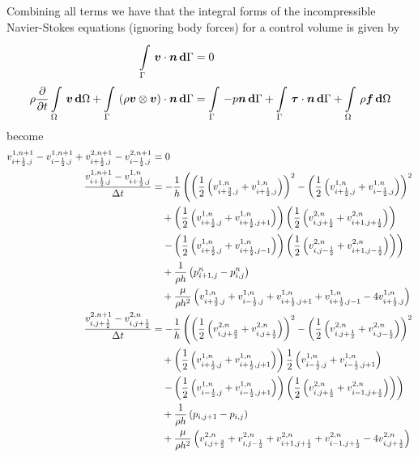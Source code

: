 Combining all terms we have that the integral forms of the incompressible Navier-Stokes
equations (ignoring body forces) for a control volume is given by
\begin{equation}
  \begin{split}
      \displaystyle\int\limits_{\Gamma}^{} \,\boldsymbol{v}\cdot\boldsymbol{n}\, \boldsymbol{\mathrm{d}} \Gamma &=0 \\
    \rho \dfrac{\partial }{\partial t}   \displaystyle\int\limits_{\Omega}^{} \,\boldsymbol{v}\, \boldsymbol{\mathrm{d}} \Omega +  \displaystyle\int\limits_{\Gamma}^{} \,\left(  \rho\boldsymbol{v} \otimes \boldsymbol{v}  \right)\cdot\boldsymbol{n}\, \boldsymbol{\mathrm{d}} \Gamma 
  &=  \displaystyle\int\limits_{\Gamma}^{} \,-p\boldsymbol{n}\, \boldsymbol{\mathrm{d}} \Gamma +  \displaystyle\int\limits_{\Gamma}^{} \,\boldsymbol{\mathit{\tau}}\cdot\boldsymbol{n}\, \boldsymbol{\mathrm{d}} \Gamma 
  +  \displaystyle\int\limits_{\Omega}^{} \,\rho\boldsymbol{f}\, \boldsymbol{\mathrm{d}} \Omega 
  \end{split}
\end{equation}
become
\begin{equation}
  \begin{split}
    v^{1,n+1}_{i+\frac{1}{2},j}-v^{1,n+1}_{i-\frac{1}{2},j}+v^{2,n+1}_{i+\frac{1}{2},j}-v^{2,n+1}_{i-\frac{1}{2},j}&=0
    \\
    \dfrac{v^{1,n+1}_{i+\frac{1}{2},j}-v^{1,n}_{i+\frac{1}{2},j}}{\Delta
      t}&=-\dfrac{1}{h}
    \left(\left( \frac{1}{2}\left( v^{1,n}_{i+\frac{3}{2},j}+v^{1,n}_{i+\frac{1}{2},j} \right) \right)^{2}
    -\left( \frac{1}{2}\left( v^{1,n}_{i+\frac{1}{2},j}+v^{1,n}_{i-\frac{1}{2},j} \right) \right)^{2}\right. \\
    &\quad+\left( \frac{1}{2}\left( v^{1,n}_{i+\frac{1}{2},j}+v^{1,n}_{i+\frac{1}{2},j+1} \right) \right)
    \left( \frac{1}{2}\left( v^{2,n}_{i,j+\frac{1}{2}}+v^{2,n}_{i+1,j+\frac{1}{2}} \right) \right) \\
    &\quad\left.-\left( \frac{1}{2}\left( v^{1,n}_{i+\frac{1}{2},j}+v^{1,n}_{i+\frac{1}{2},j-1} \right) \right)
    \left( \frac{1}{2}\left( v^{2,n}_{i,j-\frac{1}{2}}+v^{2,n}_{i+1,j-\frac{1}{2}} \right) \right)\right)\\
    &\quad+\dfrac{1}{\rho h}\left( p^{n}_{i+1,j}-p^{n}_{i,j} \right)\\
    &\quad+\dfrac{\mu}{\rho h^{2}}\left( v^{1,n}_{i+\frac{3}{2},j}+v^{1,n}_{i-\frac{1}{2},j}
      +v^{1,n}_{i+\frac{1}{2},j+1}+v^{1,n}_{i+\frac{1}{2},j-1}-4v^{1,n}_{i+\frac{1}{2},j} \right)
    \\
    \dfrac{v^{2,n+1}_{i,j+\frac{1}{2}}-v^{2,n}_{i,j+\frac{1}{2}}}{\Delta
      t}&=-\dfrac{1}{h}\left(\left( \frac{1}{2}\left( v^{2,n}_{i,j+\frac{3}{2}}+v^{2,n}_{i,j+\frac{1}{2}} \right) \right)^{2}
    -\left( \frac{1}{2}\left( v^{2,n}_{i,j+\frac{1}{2}}+v^{2,n}_{i,j-\frac{1}{2}} \right) \right)^{2}\right. \\
    &\quad+\left( \frac{1}{2}\left( v^{1,n}_{i+\frac{1}{2},j}+v^{1,n}_{i+\frac{1}{2},j+1} \right) \right)
    \frac{1}{2}\left( v^{1,n}_{i-\frac{1}{2},j}+v^{1,n}_{i-\frac{1}{2},j+1} \right) \\
    &\quad\left.-\left( \frac{1}{2}\left( v^{1,n}_{i-\frac{1}{2},j}+v^{1,n}_{i-\frac{1}{2},j+1} \right) \right)
    \left( \frac{1}{2}\left( v^{2,n}_{i,j+\frac{1}{2}}+v^{2,n}_{i-1,j+\frac{1}{2}} \right) \right)\right)\\
    &\quad +\dfrac{1}{\rho h}\left( p_{i,j+1}-p_{i,j} \right)\\
    &\quad +\dfrac{\mu}{\rho h^{2}}\left( v^{2,n}_{i,j+\frac{3}{2}}+v^{2,n}_{i,j-\frac{1}{2}}
    +v^{2,n}_{i+1,j+\frac{1}{2}}+v^{2,n}_{i-1,j+\frac{1}{2}}-4v^{2,n}_{i,j+\frac{1}{2}} \right)
  \end{split}
\end{equation}


